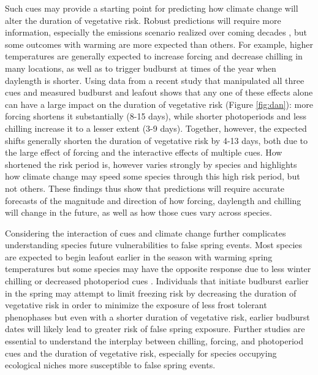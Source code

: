\documentclass{article}\usepackage[]{graphicx}\usepackage[]{color}
\begin{document}
Such cues may provide a starting point for predicting how climate change will alter the duration of vegetative risk. Robust predictions will require more information, especially the emissions scenario realized over coming decades \citep{IPCC2014}, but some outcomes with warming are more expected than others. For example, higher temperatures are generally expected to increase forcing and decrease chilling in many locations, as well as to trigger budburst at times of the year when daylength is shorter. Using data from a recent study that manipulated all three cues and measured budburst and leafout \citep{Flynn2018} shows that any one of these effects alone can have a large impact on the duration of vegetative risk (Figure \ref{fig:dan}): more forcing shortens it substantially (8-15 days), while shorter photoperiods and less chilling increase it to a lesser extent (3-9 days). Together, however, the expected shifts generally shorten the duration of vegetative risk by 4-13 days, both due to the large effect of forcing and the interactive effects of multiple cues. How shortened the risk period is, however varies strongly by species and highlights how climate change may speed some species through this high risk period, but not others. These findings thus show that predictions will require accurate forecasts of the magnitude and direction of how forcing, daylength and chilling will change in the future, as well as how those cues vary across species. 

Considering the interaction of cues and climate change further complicates understanding species future vulnerabilities to false spring events. Most species are expected to begin leafout earlier in the season with warming spring temperatures but some species may have the opposite response due to less winter chilling or decreased photoperiod cues \citep{Cleland2006, Fu2015, Xin2016}. %
Individuals that initiate budburst earlier in the spring may attempt to limit freezing risk by decreasing the duration of vegetative risk in order to minimize the exposure of less frost tolerant phenophases \citep{Augspurger2009} but even with a shorter duration of vegetative risk, earlier budburst dates will likely lead to greater risk of false spring exposure. Further studies are essential to understand the interplay between chilling, forcing, and photoperiod cues and the duration of vegetative risk, especially for species occupying ecological niches more susceptible to false spring events. 
\end{document}
